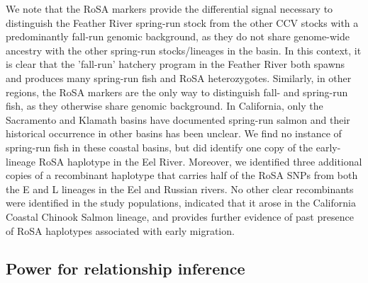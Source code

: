 We note that the RoSA markers provide the differential signal necessary to distinguish the
Feather River spring-run stock from the other CCV stocks with a predominantly fall-run
genomic background, as they do not share genome-wide ancestry with the other spring-run
stocks/lineages in the basin. In this context, it is clear that the 'fall-run' hatchery
program in the Feather River both spawns and produces many spring-run fish and RoSA heterozygotes.
Similarly, in other regions, the RoSA markers are the only way to distinguish fall-
and spring-run fish, as they otherwise share genomic background.
In California, only the Sacramento and  Klamath basins have documented spring-run
salmon and their historical occurrence in other basins has been unclear. We find no
instance of spring-run fish in these coastal basins, but did identify one copy of the early-lineage
RoSA haplotype in the Eel River. Moreover, we identified three additional copies of a
recombinant haplotype that carries half of the RoSA SNPs from both the E and L lineages in the Eel and Russian rivers. No other clear recombinants were identified in the study populations, indicated that it arose in the California Coastal Chinook Salmon lineage, and provides further evidence of past presence of RoSA haplotypes associated with early migration.





\subsection*{Power for relationship inference}

